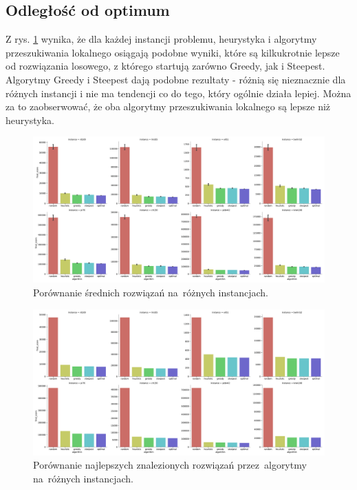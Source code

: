 \subsection{Odległość od optimum}

Z rys. \ref{fig:avg} wynika, że dla każdej instancji problemu, heurystyka i algorytmy przeszukiwania lokalnego osiągają podobne wyniki, które są kilkukrotnie lepsze od rozwiązania losowego, z którego startują zarówno Greedy, jak i Steepest. Algorytmy Greedy i Steepest dają podobne rezultaty - różnią się nieznacznie dla różnych instancji i nie ma tendencji co do tego, który ogólnie działa lepiej. Można za to zaobserwować, że oba algorytmy przeszukiwania lokalnego są lepsze niż heurystyka.

\begin{figure}
\begin{center}
\includegraphics[width=1.0\textwidth]{graphs/score_comparison_bar_avg.pdf}
\end{center}
\caption{Porównanie średnich rozwiązań na~różnych instancjach.}
\label{fig:avg}
\end{figure}

\begin{figure}
\begin{center}
\includegraphics[width=1.0\textwidth]{graphs/score_comparison_bar_min.pdf}
\end{center}
\caption{Porównanie najlepszych znalezionych rozwiązań przez~algorytmy na~różnych instancjach.}
\label{fig:best}
\end{figure}

